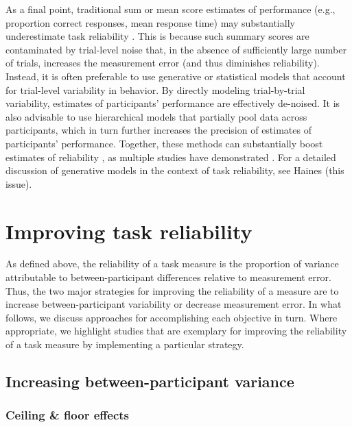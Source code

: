 \documentclass[a4paper,12pt]{article}
\begin{document}
As a final point, traditional sum or mean score estimates of performance (e.g., proportion correct responses, mean response time) may substantially underestimate task reliability \cite{Rouder2019-am, haines2020learning}. This is because such summary scores are contaminated by trial-level noise that, in the absence of sufficiently large number of trials, increases the measurement error (and thus diminishes reliability). Instead, it is often preferable to use generative or statistical models that account for trial-level variability in behavior. By directly modeling trial-by-trial variability, estimates of participants' performance are effectively de-noised. It is also advisable to use hierarchical models that partially pool data across participants, which in turn further increases the precision of estimates of participants' performance. Together, these methods can substantially boost estimates of reliability \cite{Rouder2019-am, haines2020learning}, as multiple studies have demonstrated  \cite{snijder2022psychometric, sullivan2022enhancing, brown2020improving, waltmann2022sufficient}. For a detailed discussion of generative models in the context of task reliability, see Haines (this issue).

\section{Improving task reliability}

As defined above, the reliability of a task measure is the proportion of variance attributable to between-participant differences relative to measurement error. Thus, the two major strategies for improving the reliability of a measure are to increase between-participant variability or decrease measurement error. In what follows, we discuss approaches for accomplishing each objective in turn. Where appropriate, we highlight studies that are exemplary for improving the reliability of a task measure by implementing a particular strategy. 

\subsection{Increasing between-participant variance}

\subsubsection{Ceiling \& floor effects}
\end{document}
